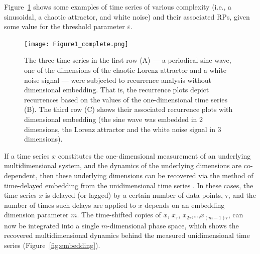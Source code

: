 Figure~\ref{fig:examples} shows some examples of time series of various complexity (i.e., a sinusoidal, a chaotic attractor, and white noise) and their associated RPs, given some value for the threshold parameter $\varepsilon$.

\begin{figure}
\texttt{[image: Figure1\_complete.png]}
\caption{\label{fig:examples}The three-time series in the first row (A) --- a periodical sine wave, one of the dimensions of the chaotic Lorenz attractor and a white noise signal --- were subjected to recurrence analysis without dimensional embedding. That is, the recurrence plots depict recurrences based on the values of the one-dimensional time series (B). The third row (C) shows their associated recurrence plots with dimensional embedding (the sine wave was embedded in 2 dimensions, the Lorenz attractor and the white noise signal in 3 dimensions).}
\end{figure}

If a time series $x$ constitutes the one-dimensional measurement of an underlying multidimensional system, and the dynamics of the underlying dimensions are co-dependent, then these underlying dimensions can be recovered via the method of time-delayed embedding from the unidimensional time series \citep{packard1980geometry, takens1981detecting}. In these cases, the time series $x$ is delayed (or lagged) by a certain number of data points, $\tau$, and the number of times such delays are applied to $x$ depends on an embedding dimension parameter $m$. The time-shifted copies of $x$, $x_{\tau}$, $x_{2\tau}$,\ldots ,$x_{(m-1)\tau}$, can now be integrated into a single $m$-dimensional phase space, which shows the recovered multidimensional dynamics behind the measured unidimensional time series (Figure~\ref{fig:embedding}).

